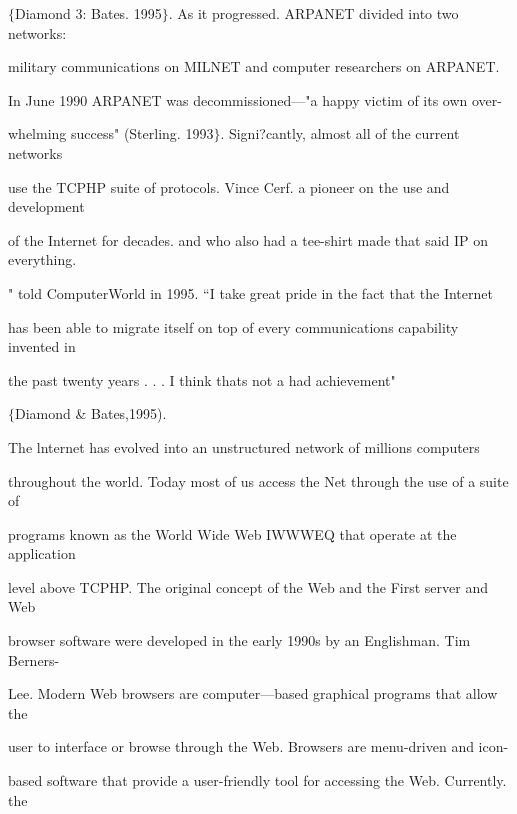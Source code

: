 \documentclass{book} %
\begin{document}


\noindent \begin{flushleft}
$\mathrm{\{}$Diamond 3: Bates. 1995$\mathrm{\}}$. As it progressed. ARPANET divided into two networks:

\noindent military communications on MILNET and computer researchers on ARPANET.

\noindent 

\noindent      In June 1990 ARPANET was decommissioned---"a happy victim of its own over-

\noindent whelming success" (Sterling. 1993$\mathrm{\}}$. Signi?cantly, almost all of the current networks

\noindent use the TCPHP suite of protocols. Vince Cerf. a pioneer on the use and development

\noindent of the Internet for decades. and who also had a tee-shirt made that said IP on everything.

\noindent " told ComputerWorld in 1995. ``I take great pride in the fact that the Internet

\noindent has been able to migrate itself on top of every communications capability invented in

\noindent the past twenty years . . . I think thats not a had achievement"

\noindent  $\mathrm{\{}$Diamond \& Bates,1995).

\noindent 

\noindent The lnternet has evolved into an unstructured network of millions computers

\noindent throughout the world. Today most of us access the Net through the use of a suite of

\noindent programs known as the World Wide Web IWWWEQ that operate at the application

\noindent level above TCPHP. The original concept of the Web and the First server and Web

\noindent browser software were developed in the early 1990s by an Englishman. Tim Berners-

\noindent Lee. Modern Web browsers are computer---based graphical programs that allow the

\noindent user to interface or browse through the Web. Browsers are menu-driven and icon-

\noindent based software that provide a user-friendly tool for accessing the Web. Currently. the


\end{flushleft}
\end{document}
